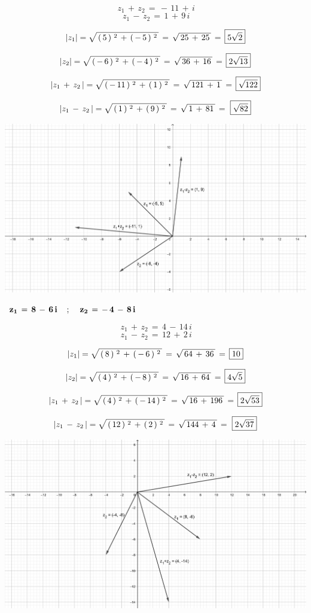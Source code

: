 \documentclass[a4paper,11pt,openany]{book}
\begin{document}
$$\,{z_1}\,+\,{z_2}\,=\,-\,11\,+\,i$$
$$\,{z_1}\,-\,{z_2}\,=\,1\,+\,9\,i$$

$$\lvert z_1\rvert = \sqrt{\,(\,5\,)\,^{\,2}\,+\,(\,-\,5\,)\,^{\,2}\,}\,=\,\sqrt{\,25\,+\,25\,}\,=\,\boxed{5\sqrt{2}}$$

$$\lvert z_2\rvert = \sqrt{\,(\,-\,6\,)\,^{\,2}\,+\,(\,-\,4\,)\,^{\,2}\,}\,=\,\sqrt{\,36\,+\,16\,}\,=\,\boxed{2\sqrt{13}}$$

$$\lvert z_1\,+\,{z_2}\,\rvert = \sqrt{\,(\,-\,11\,)\,^{\,2}\,+\,(\,1\,)\,^{\,2}\,}\,=\,\sqrt{\,121\,+\,1\,}\,=\,\boxed{\sqrt{122}}$$

$$\lvert z_1\,-\,{z_2}\,\rvert = \sqrt{\,(\,1\,)\,^{\,2}\,+\,(\,9\,)\,^{\,2}\,}\,=\,\sqrt{\,1\,+\,81\,}\,=\,\,\boxed{\sqrt{82}}$$

\includegraphics[width=15cm]{geo2}

\textcolor{ao(english)}{}\,\quad\,$\bf{z_{1}\,=\,8\,-\,6\,i \quad\,;\,\quad z_{2}\,=\,-\,4\,-\,8\,i}$

$$\,{z_1}\,+\,{z_2}\,=\,4\,-\,14\,i$$
$$\,{z_1}\,-\,{z_2}\,=\,12\,+\,2\,i$$

$$\lvert z_1\rvert = \sqrt{\,(\,8\,)\,^{\,2}\,+\,(\,-\,6\,)\,^{\,2}\,}\,=\,\sqrt{\,64\,+\,36\,}\,=\,\boxed{10}$$

$$\lvert z_2\rvert = \sqrt{\,(\,4\,)\,^{\,2}\,+\,(\,-\,8\,)\,^{\,2}\,}\,=\,\sqrt{\,16\,+\,64\,}\,=\,\boxed{4\sqrt{5}}$$

$$\lvert z_1\,+\,{z_2}\,\rvert = \sqrt{\,(\,4\,)\,^{\,2}\,+\,(\,-\,14\,)\,^{\,2}\,}\,=\,\sqrt{\,16\,+\,196\,}\,=\,\boxed{2\sqrt{53}}$$

$$\lvert z_1\,-\,{z_2}\,\rvert = \sqrt{\,(\,12\,)\,^{\,2}\,+\,(\,2\,)\,^{\,2}\,}\,=\,\sqrt{\,144\,+\,4\,}\,=\,\,\boxed{2\sqrt{37}}$$

\includegraphics[width=15cm]{geo3}
\end{document}
